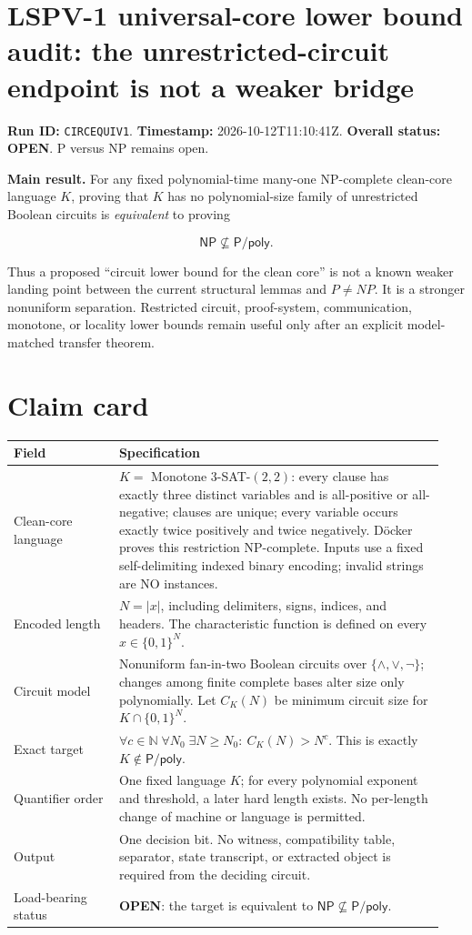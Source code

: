 \documentclass[11pt]{article}
\newcommand{\NP}{\mathsf{NP}}
\begin{document}
\section*{LSPV-1 universal-core lower bound audit: the unrestricted-circuit endpoint is not a weaker bridge}

\noindent\textbf{Run ID:} \texttt{CIRCEQUIV1}.\quad
\textbf{Timestamp:} 2026-10-12T11:10:41Z.\quad
\textbf{Overall status:} \textbf{OPEN}.  P versus NP remains open.

\medskip
\noindent\textbf{Main result.}
For any fixed polynomial-time many-one NP-complete clean-core language \(K\), proving that \(K\) has no polynomial-size family of unrestricted Boolean circuits is \emph{equivalent} to proving

\[
\NP\not\subseteq \mathsf{P/poly}.
\]

Thus a proposed ``circuit lower bound for the clean core'' is not a known weaker landing point between the current structural lemmas and \(P\ne NP\).  It is a stronger nonuniform separation.  Restricted circuit, proof-system, communication, monotone, or locality lower bounds remain useful only after an explicit model-matched transfer theorem.

\section*{Claim card}

\begin{longtable}{p{0.23\linewidth}p{0.71\linewidth}}
\toprule
\textbf{Field} & \textbf{Specification}\\
\midrule
Clean-core language & \(K=\) Monotone \(3\)-SAT-\((2,2)\): every clause has exactly three distinct variables and is all-positive or all-negative; clauses are unique; every variable occurs exactly twice positively and twice negatively.  D\"ocker proves this restriction NP-complete.  Inputs use a fixed self-delimiting indexed binary encoding; invalid strings are NO instances.\\
Encoded length & \(N=|x|\), including delimiters, signs, indices, and headers.  The characteristic function is defined on every \(x\in\{0,1\}^{N}\).\\
Circuit model & Nonuniform fan-in-two Boolean circuits over \(\{\wedge,\vee,\neg\}\); changes among finite complete bases alter size only polynomially.  Let \(C_K(N)\) be minimum circuit size for \(K\cap\{0,1\}^{N}\).\\
Exact target & 
\(
\forall c\in\mathbb N\;\forall N_0\;\exists N\ge N_0:\ C_K(N)>N^c.
\)
This is exactly \(K\notin\mathsf{P/poly}\).\\
Quantifier order & One fixed language \(K\); for every polynomial exponent and threshold, a later hard length exists.  No per-length change of machine or language is permitted.\\
Output & One decision bit.  No witness, compatibility table, separator, state transcript, or extracted object is required from the deciding circuit.\\
Load-bearing status & \textbf{OPEN}: the target is equivalent to \(\NP\not\subseteq\mathsf{P/poly}\).\\
\bottomrule
\end{longtable}
\end{document}
